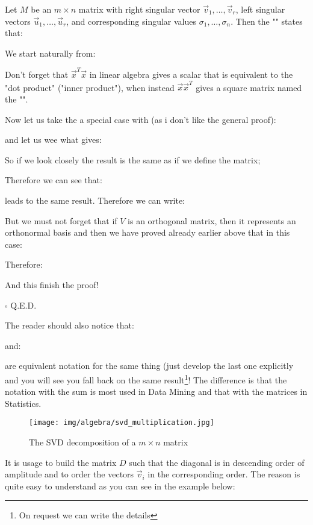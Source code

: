 	\begin{theorem}
	Let $M$ be an $m\times n$ matrix with right singular vector $\vec{v}_1,\ldots,\vec{v}_r$, left singular vectors $\vec{u}_1,\ldots,\vec{u}_r$, and corresponding singular values $\sigma_1,\ldots,\sigma_n$. Then the "" states that:
	
	\end{theorem}
	\begin{dem}
	We start naturally from:
	
	\begin{tcolorbox}[title=Remark,colframe=black,arc=10pt]
	Don't forget that $\vec{x}^T\vec{x}$ in linear algebra gives a scalar that is equivalent to the "dot product" ("inner product"), when instead $\vec{x}\vec{x}^T$ gives a square matrix named the "".
	\end{tcolorbox}
	Now let us take the a special case with (as i don't like the general proof):
	

	and let us wee what gives:
	
	So if we look closely the result is the same as if we define the matrix;
	
	Therefore we can see that:
	
	leads to the same result. Therefore we can write:
	
	But we must not forget that if  $V$ is an orthogonal matrix, then it represents an orthonormal basis and then we have proved already earlier above that in this case:
	
	Therefore:
	
	And this finish the proof!
	\begin{flushright}
		$\square$  Q.E.D.
	\end{flushright}
	\end{dem}
	The reader should also notice that:
	
	and:
	
	are equivalent notation for the same thing (just develop the last one explicitly and you will see you fall back on the same result\footnote{On request we can write the details}! The difference is that the notation with the sum is most used in Data Mining and that with the matrices in Statistics.
	\begin{figure}[H]
		\centering
		\texttt{[image: img/algebra/svd\_multiplication.jpg]}
		\caption{The SVD decomposition of a $m\times n$ matrix}
	\end{figure}
	It is usage to build the matrix $D$ such that the diagonal is in descending order of amplitude and to order the vectors $\vec{v}_i$ in the corresponding order. The reason is quite easy to understand as you can see in the example below:
	
